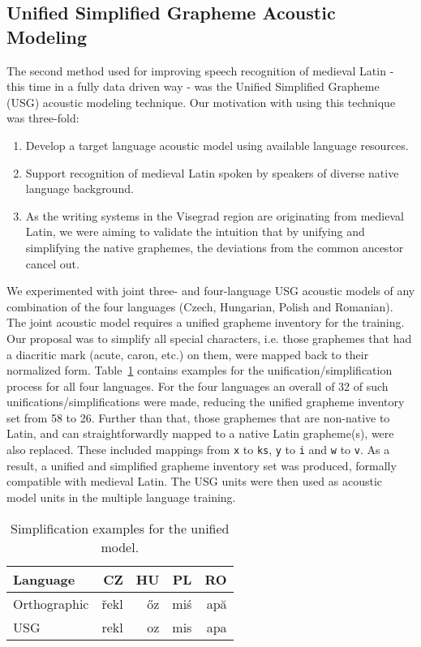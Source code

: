 \documentclass[runningheads,a4paper]{llncs}
\begin{document}
\subsection{Unified Simplified Grapheme Acoustic Modeling}\label{usg}
The second method used for improving speech recognition of medieval Latin - this time in a fully data driven way - was the Unified Simplified Grapheme (USG) acoustic modeling technique.
Our motivation with using this technique was three-fold:
\begin{enumerate}
\item Develop a target language acoustic model using available language resources.
\item Support recognition of medieval Latin spoken by speakers of diverse native language background.
\item As the writing systems in the Visegrad region are originating from medieval Latin, we were aiming to validate the intuition that by unifying and simplifying the native graphemes, the deviations from the common ancestor cancel out.
\end{enumerate}
We experimented with joint three- and four-language USG acoustic models of any combination of the four languages (Czech, Hungarian, Polish and Romanian). 
The joint acoustic model requires a unified grapheme inventory for the training.
Our proposal was to simplify all special characters, i.e. those graphemes that had a diacritic mark (acute, caron, etc.) on them, were mapped back to their normalized form.
Table~\ref{tbl:usg-examples} contains examples for the unification/simplification process for all four languages.
For the four languages an overall of 32 of such unifications/simplifications were made, reducing the unified grapheme inventory set from 58 to 26.
Further than that, those graphemes that are non-native to Latin, and can straightforwardly mapped to a native Latin grapheme(s), were also replaced.
These included mappings from \texttt{x} to \texttt{ks}, \texttt{y} to \texttt{i} and \texttt{w} to \texttt{v}.
As a result, a unified and simplified grapheme inventory set was produced, formally compatible with medieval Latin.
The USG units were then used as acoustic model units in the multiple language training.

\begin{table}
	\centering
	\caption{Simplification examples for the unified model.}\label{tbl:usg-examples}
	\begin{tabular}{l|rrrr}
	\hline
	Language & CZ & HU & PL & RO \\
	\hline
	Orthographic & \v{r}ekl & \H{o}z & mi\'{s} & ap\u{a} \\
	USG & rekl & oz & mis & apa \\
	\hline
	\end{tabular}
\end{table}
\end{document}
